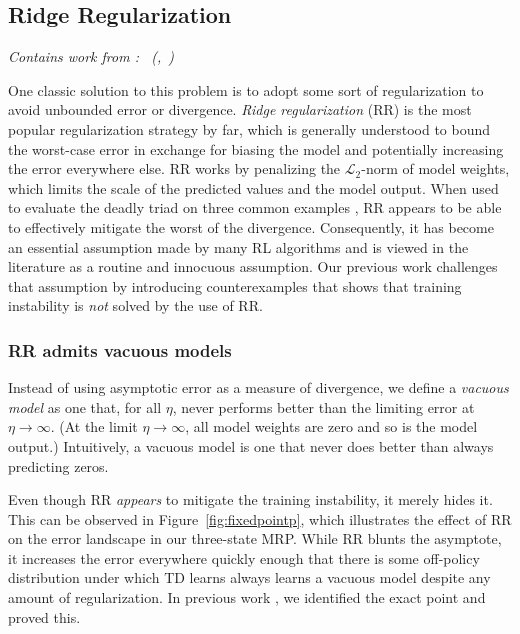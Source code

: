 \documentclass[11pt]{article}
\newcommand{\subsectionsubtitle}[1]{\vspace{-0.5em}\textit{#1}\vspace{0.5em}}
\begin{document}
\subsection{Ridge Regularization}
\subsectionsubtitle{Contains work from \cite{manek2022pitfalls}: \citetitle{manek2022pitfalls}~(\citeauthor{manek2022pitfalls},~\citeyear{manek2022pitfalls})}
\label{sec:rr}

One classic solution to this problem is to adopt some sort of regularization to avoid unbounded error or divergence. \emph{Ridge regularization} (RR) \cite{tikhonov1943stability} is the most popular regularization strategy by far, which is generally understood to bound the worst-case error in exchange for biasing the model and potentially increasing the error everywhere else. RR works by penalizing the $\mathcal L_2$-norm of model weights, which limits the scale of the predicted values and the model output. When used to evaluate the deadly triad on three common examples \cite[pg.260]{kolter2011fixed,baird1993counterexample,sutton2020reinforcement}, RR appears to be able to effectively mitigate the worst of the divergence. Consequently, it has become an essential assumption made by many RL algorithms \cite{diddigi2019convergent,mahadevan2014proximal,sutton2009fast,yu2017convergence,zhang2020provably,zhang2021breaking} and is viewed in the literature as a routine and innocuous assumption. Our previous work \citep{manek2022pitfalls} challenges that assumption by introducing counterexamples that shows that training instability is \emph{not} solved by the use of RR.

\subsubsection{RR admits vacuous models}
Instead of using asymptotic error as a measure of divergence, we define a \emph{vacuous model} as one that, for all $\eta$, never performs better than the limiting error at $\eta\to\infty$. (At the limit $\eta\to\infty$, all model weights are zero and so is the model output.) Intuitively, a vacuous model is one that never does better than always predicting zeros.

Even though RR \emph{appears} to mitigate the training instability, it merely hides it. This can be observed in Figure~\ref{fig:fixedpointp}, which illustrates the effect of RR on the error landscape in our three-state MRP. While RR blunts the asymptote, it increases the error everywhere quickly enough that there is some off-policy distribution under which TD learns always learns a vacuous model despite any amount of regularization. In previous work \citep{manek2022pitfalls}, we identified the exact point and proved this.
\end{document}
